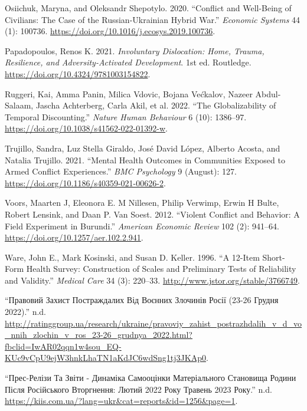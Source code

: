 \documentclass[
  letterpaper,
  DIV=11,
  numbers=noendperiod]{scrartcl}
\newlength{\cslhangindent}
\newlength{\cslentryspacingunit} %
\newenvironment{CSLReferences}[2] %
 {%
  \setlength{\parindent}{0pt}
  \ifodd #1
  \let\oldpar\par
  \def\par{\hangindent=\cslhangindent\oldpar}
  \fi
  \setlength{\parskip}{#2\cslentryspacingunit}
 }%
 {}
\begin{document}
\begin{CSLReferences}{1}{0}
\leavevmode{}%
Osiichuk, Maryna, and Oleksandr Shepotylo. 2020. {``Conflict and
Well-Being of Civilians: The Case of the Russian-Ukrainian Hybrid
War.''} \emph{Economic Systems} 44 (1): 100736.
\url{https://doi.org/10.1016/j.ecosys.2019.100736}.

\leavevmode{}%
Papadopoulos, Renos K. 2021. \emph{Involuntary Dislocation: Home,
Trauma, Resilience, and Adversity-Activated Development}. 1st ed.
Routledge. \url{https://doi.org/10.4324/9781003154822}.

\leavevmode{}%
Ruggeri, Kai, Amma Panin, Milica Vdovic, Bojana Većkalov, Nazeer
Abdul-Salaam, Jascha Achterberg, Carla Akil, et al. 2022. {``The
Globalizability of Temporal Discounting.''} \emph{Nature Human
Behaviour} 6 (10): 1386--97.
\url{https://doi.org/10.1038/s41562-022-01392-w}.

\leavevmode{}%
Trujillo, Sandra, Luz Stella Giraldo, José David López, Alberto Acosta,
and Natalia Trujillo. 2021. {``Mental Health Outcomes in Communities
Exposed to Armed Conflict Experiences.''} \emph{BMC Psychology} 9
(August): 127. \url{https://doi.org/10.1186/s40359-021-00626-2}.

\leavevmode{}%
Voors, Maarten J, Eleonora E. M Nillesen, Philip Verwimp, Erwin H Bulte,
Robert Lensink, and Daan P. Van Soest. 2012. {``Violent Conflict and
Behavior: A Field Experiment in Burundi.''} \emph{American Economic
Review} 102 (2): 941--64. \url{https://doi.org/10.1257/aer.102.2.941}.

\leavevmode{}%
Ware, John E., Mark Kosinski, and Susan D. Keller. 1996. {``A 12-Item
Short-Form Health Survey: Construction of Scales and Preliminary Tests
of Reliability and Validity.''} \emph{Medical Care} 34 (3): 220--33.
\url{http://www.jstor.org/stable/3766749}.

\leavevmode{}%
{``Правовий Захист Постраждалих Від Воєнних Злочинів Росії (23-26 Грудня
2022).''} n.d.
\url{http://ratinggroup.ua/research/ukraine/pravoviy_zahist_postrazhdalih_v_d_vo_nnih_zlochin_v_ros_23-26_grudnya_2022.html?fbclid=IwAR02qqn1w4sou_EQ-KUc9vCpU9ejW3hnkLhaTN1aKdJC6wdSng1tj3JKAp0}.

\leavevmode{}%
{``Прес-Релізи Та Звіти - Динаміка Самооцінки Матеріального Становища
Родини Після Російського Вторгнення: Лютий 2022 Року {\textendash}
Травень 2023 Року.''} n.d.
\url{https://kiis.com.ua/?lang=ukr\&cat=reports\&id=1256\&page=1}.

\end{CSLReferences}
\end{document}
